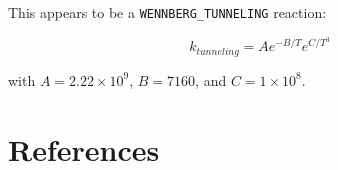 \documentclass[titlepage]{article}
\begin{document}
This appears to be a \verb>WENNBERG_TUNNELING> reaction:

\begin{equation}
k_{tunneling} = A e^{-B/T} e^{C/T^3}
\end{equation}

\noindent with $A = 2.22 \times 10^{9}$, $B = 7160$, and $C = 1 \times 10^8$.



\section{References}

\printbibliography
\end{document}
